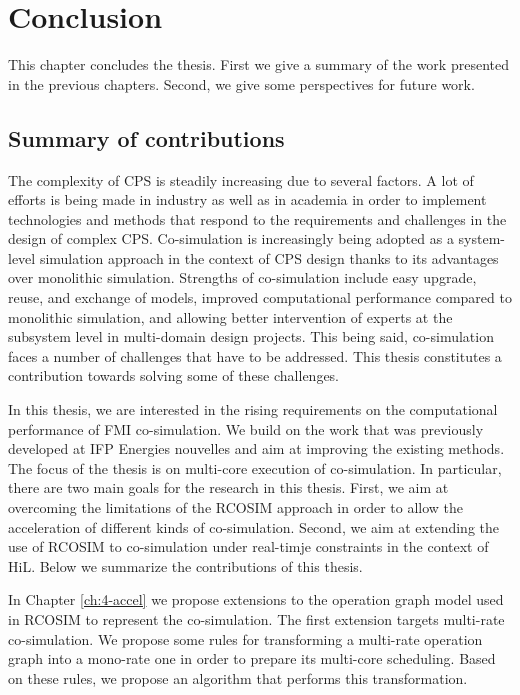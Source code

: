 \chapter{\label{ch:7-concl}Conclusion} 

\minitoc

This chapter concludes the thesis. First we give a summary of the work presented in the previous chapters. Second, we give some perspectives for future work.

\section{Summary of contributions}

The complexity of CPS is steadily increasing due to several factors. A lot of efforts is being made in industry as well as in academia in order to implement technologies and methods that respond to the requirements and challenges in the design of complex CPS. Co-simulation is increasingly being adopted as a system-level simulation approach in the context of CPS design thanks to its advantages over monolithic simulation. Strengths of co-simulation include easy upgrade, reuse, and exchange of models, improved computational performance compared to monolithic simulation, and allowing better intervention of experts at the subsystem level in multi-domain design projects. This being said, co-simulation faces a number of challenges that have to be addressed. This thesis constitutes a contribution towards solving some of these challenges.   

In this thesis, we are interested in the rising requirements on the computational performance of FMI co-simulation. We build on the work that was previously developed at IFP Energies nouvelles and aim at improving the existing methods. The focus of the thesis is on multi-core execution of co-simulation. In particular, there are two main goals for the research in this thesis. First, we aim at overcoming the limitations of the RCOSIM approach in order to allow the acceleration of different kinds of co-simulation. Second, we aim at extending the use of RCOSIM to co-simulation under real-timje constraints in the context of HiL. Below we summarize the contributions of this thesis.

In Chapter \ref{ch:4-accel} we propose extensions to the operation graph model used in RCOSIM to represent the co-simulation. The first extension targets multi-rate co-simulation. We propose some rules for transforming a multi-rate operation graph into a mono-rate one in order to prepare its multi-core scheduling. Based on these rules, we propose an algorithm that performs this transformation.

